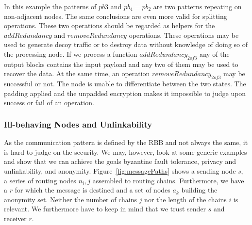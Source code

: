 \documentclass[10pt,journal,compsoc,twocolumn,twoside]{IEEEtran}
\begin{document}
%
In this example the patterns of $pb3$ and $pb_4=pb_2$ are two patterns repeating on non-adjacent nodes. The same conclusions are even more valid for splitting operations. These two operations should be regarded as helpers for the $addRedundancy$ and $removeRedundancy$ operations. These operations may be used to generate decoy traffic or to destroy data without knowledge of doing so of the processing node. If we process a function $addRedundancy_{2 of 3}$ any of the output blocks contains the input payload and any two of them may be used to recover the data. At the same time, an operation $removeRedundancy_{2 of 3}$ may be successful or not. The node is unable to differentiate between the two states. The padding applied and the unpadded encryption makes it impossible to judge upon success or fail of an operation.

\subsubsection{Ill-behaving Nodes and Unlinkability}
As the communication pattern is defined by the RBB and not always the same, it is hard to judge on the security. We may, however, look at some generic examples and show that we can achieve the goals byzantine fault tolerance, privacy and unlinkability, and anonymity. Figure~\ref{fig:messagePaths} shows a sending node $s$, a series of routing nodes $n_i,j$ assembled to routing chains. Furthermore, we have a $r$ for which the message is destined and a set of nodes $a_k$ building the anonymity set. Neither the number of chains $j$ nor the length of the chains $i$ is relevant. We furthermore have to keep in mind that we trust sender $s$ and receiver $r$.
\end{document}
